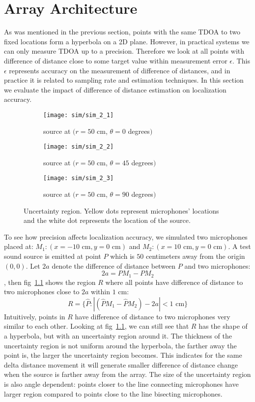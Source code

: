 \chapter{Array Architecture}
As was mentioned in the previous section, points with the same TDOA to two fixed locations form a hyperbola on a 2D plane. However, in practical systems we can only measure TDOA up to a precision. Therefore we look at all points with difference of distance close to some target value within measurement error $\epsilon$. This $\epsilon$ represents accuracy on the measurement of difference of distances, and in practice it is related to sampling rate and estimation techniques. In this section we evaluate the impact of difference of distance estimation on localization accuracy.

\begin{figure}[]
  \centering
  \begin{subfigure}[]{.23\textwidth}
    \texttt{[image: sim/sim\_2\_1]}
    \caption{source at $(r=50$ cm, $\theta = 0$ degrees$)$}
  \end{subfigure}
  \begin{subfigure}[]{.23\textwidth}
    \texttt{[image: sim/sim\_2\_2]}
    \caption{source at $(r=50$ cm, $\theta = 45$ degrees$)$}
  \end{subfigure}
  \begin{subfigure}[]{.23\textwidth}
    \texttt{[image: sim/sim\_2\_3]}
    \caption{source at $(r=50$ cm, $\theta = 90$ degrees$)$}
  \end{subfigure}
  \caption{Uncertainty region. Yellow dots represent microphones' locations and the white dot represents the location of the source.}
  \label{fig:sim_2_5}
\end{figure}

To see how precision affects localization accuracy, we simulated two microphones placed at: $M_1:(x=-10\mbox{ cm},y=0\mbox{ cm})$ and $M_2:(x=10\mbox{ cm},y=0\mbox{ cm})$. A test sound source is emitted at point $P$ which is $50$ centimeters away from the origin $(0,0)$. Let $2a$ denote the difference of distance between $P$ and two microphones:
\[
2a = P M_1 - P M_2 
\]
, then fig~\ref{fig:sim_2_5} shows the region $R$ where all points have difference of distance to two microphones close to $2a$ within $1$ cm:
\[
R=\{\hat P: |(\hat P M_1 - \hat P M_2) - 2a|< 1 \mbox{ cm}\}
\]
Intuitively, points in $R$ have difference of distance to two microphones very similar to each other. Looking at fig~\ref{fig:sim_2_5}, we can still see that $R$ has the shape of a hyperbola, but with an uncertainty region around it. The thickness of the uncertainty region is not uniform around the hyperbola, the farther away the point is, the larger the uncertainty region becomes. This indicates for the same delta distance movement it will generate smaller difference of distance change when the source is farther away from the array. The size of the uncertainty region is also angle dependent: points closer to the line connecting microphones have larger region compared to points close to the line bisecting microphones. 


